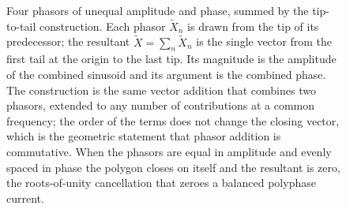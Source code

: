 \begin{figure}[htbp]
\centering
{}
\caption[Adding several phasors tip-to-tail]{Four phasors of unequal amplitude
and phase, summed by the tip-to-tail construction. Each phasor $\tilde X_{n}$
is drawn from the tip of its predecessor; the resultant $\tilde X = \sum_{n}
\tilde X_{n}$ is the single vector from the first tail at the origin to the
last tip. Its magnitude is the amplitude of the combined sinusoid and its
argument is the combined phase. The construction is the same vector addition
that combines two phasors, extended to any number of contributions at a common
frequency; the order of the terms does not change the closing vector, which is
the geometric statement that phasor addition is commutative. When the phasors
are equal in amplitude and evenly spaced in phase the polygon closes on itself
and the resultant is zero, the roots-of-unity cancellation that zeroes a
balanced polyphase current.}
\label{fig:vol02ch03:phasor-polygon}
\end{figure}
